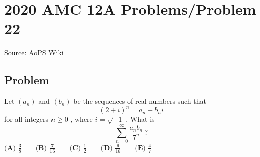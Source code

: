 \documentclass[12pt]{article}
\begin{document}
\section*{{2020 AMC 12A Problems/Problem 22}}
Source: AoPS Wiki

\subsection*{Problem}
Let $(a_n)$ and $(b_n)$ be the sequences of real numbers such that \[ (2 + i)^n = a_n + b_ni \] for all integers $n\geq 0$ , where $i = \sqrt{-1}$ . What is \[\sum_{n=0}^\infty\frac{a_nb_n}{7^n}\,?\] $\textbf{(A) }\frac 38\qquad\textbf{(B) }\frac7{16}\qquad\textbf{(C) }\frac12\qquad\textbf{(D) }\frac9{16}\qquad\textbf{(E) }\frac47$
\end{document}
